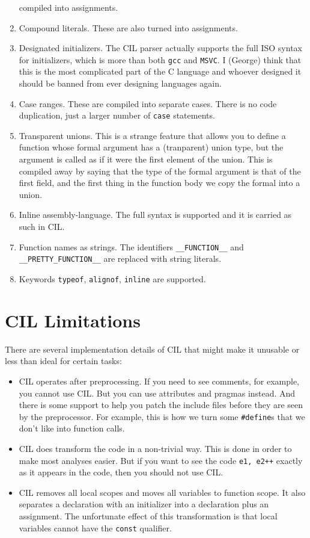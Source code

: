 \documentclass{article}
\def\t#1{{\tt #1}}
\begin{document}
\begin{enumerate}
compiled into assignments. 
\item Compound literals. These are also turned into assignments.
\item Designated initializers. The CIL parser actually supports the full ISO
syntax for initializers, which is more than both \t{gcc} and \t{MSVC}. I
(George) think that this is the most complicated part of the C language and
whoever designed it should be banned from ever designing languages again.
\item Case ranges. These are compiled into separate cases. There is no code
duplication, just a larger number of \t{case} statements.
\item Transparent unions. This is a strange feature that allows you to define
a function whose formal argument has a (tranparent) union type, but the
argument is called as if it were the first element of the union. This is
compiled away by saying that the type of the formal argument is that of the
first field, and the first thing in the function body we copy the formal into
a union. 

\item Inline assembly-language. The full syntax is supported and it is carried
as such in CIL.

\item Function names as strings. The identifiers \t{\_\_FUNCTION\_\_} and
\t{\_\_PRETTY\_FUNCTION\_\_} are replaced with string literals. 

\item Keywords \t{typeof}, \t{alignof}, \t{inline} are supported. 
\end{enumerate}

\section{CIL Limitations}

 There are several implementation details of CIL that might make it unusable
 or less than ideal for certain tasks:

\begin{itemize}
\item CIL operates after preprocessing. If you need to see comments, for
example, you cannot use CIL. But you can use attributes and pragmas instead.
And there is some support to help you patch the include files before they are
seen by the preprocessor. For example, this is how we turn some
\t{\#define}s that we don't like into function calls. 

\item CIL does transform the code in a non-trivial way. This is done in order
to make most analyses easier. But if you want to see the code \t{e1, e2++}
exactly as it appears in the code, then you should not use CIL. 

\item CIL removes all local scopes and moves all variables to function
scope. It also separates a declaration with an initializer into a declaration
plus an assignment. The unfortunate effect of this transformation is that
local variables cannot have the \t{const} qualifier.

\end{itemize}
 
\end{document}
